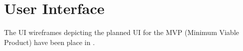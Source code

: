 

\newpage
\section{User Interface}

The UI wireframes depicting the planned UI for the MVP (Minimum Viable Product) have been place in \textbf{}.





